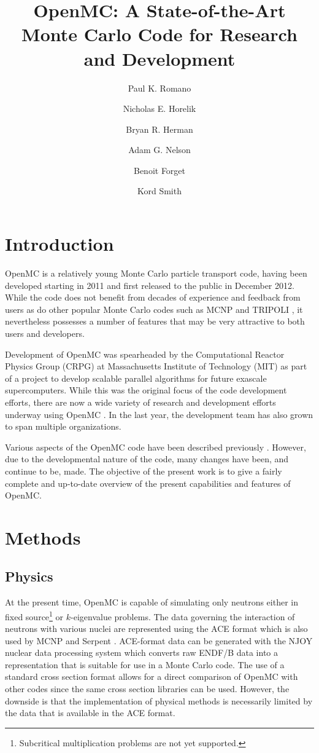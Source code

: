 \documentclass{snamc2013}
\title{OpenMC: A State-of-the-Art Monte Carlo Code for Research and
  Development}
\author[1]{Paul K. Romano}
\author[1]{Nicholas E. Horelik}
\author[1]{Bryan R. Herman}
\author[2]{Adam G. Nelson}
\author[1]{Benoit Forget}
\author[1]{Kord Smith}
\affil[1]{Massachusetts Institute of Technology, Department of Nuclear Science
  and Engineering, 77 Massachusetts Avenue, Cambridge, MA 02139}
\affil[2]{University of Michigan, Department of Nuclear Engineering and
  Radiological Sciences, 2355 Bonisteel Boulevard, Ann Arbor, MI 48104}
\begin{document}
\section{Introduction}

OpenMC is a relatively young Monte Carlo particle transport code, having been
developed starting in 2011 and first released to the public in December
2012. While the code does not benefit from decades of experience and feedback
from users as do other popular Monte Carlo codes such as MCNP
\cite{lanl-brown-2010} and TRIPOLI \cite{phytra-diop-2007}, it nevertheless
possesses a number of features that may be very attractive to both users and
developers.

Development of OpenMC was spearheaded by the Computational Reactor Physics Group
(CRPG) at Massachusetts Institute of Technology (MIT) as part of a project to
develop scalable parallel algorithms for future exascale supercomputers. While
this was the original focus of the code development efforts, there are now a
wide variety of research and development efforts underway using OpenMC
\cite{mc-romano-2013, mc-nelson-2013, jcp-siegel-2013, ijhpca-siegel-2013}. In
the last year, the development team has also grown to span multiple
organizations.

Various aspects of the OpenMC code have been described previously
\cite{ane-romano-2013, mc-romano-2013}. However, due to the developmental nature
of the code, many changes have been, and continue to be, made. The objective of
the present work is to give a fairly complete and up-to-date overview of the
present capabilities and features of OpenMC.

\section{Methods}

\subsection{Physics}

At the present time, OpenMC is capable of simulating only neutrons either in
fixed source\footnote{Subcritical multiplication problems are not yet
  supported.} or $k$-eigenvalue problems. The data governing the interaction of
neutrons with various nuclei are represented using the ACE format
\cite{lanl-x5-2008-ace} which is also used by MCNP and Serpent
\cite{vtt-leppanen-2012}. ACE-format data can be generated with the NJOY nuclear
data processing system \cite{lanl-macfarlane-2012} which converts raw ENDF/B
data into a representation that is suitable for use in a Monte Carlo code. The
use of a standard cross section format allows for a direct comparison of OpenMC
with other codes since the same cross section libraries can be used. However,
the downside is that the implementation of physical methods is necessarily
limited by the data that is available in the ACE format.
\end{document}
